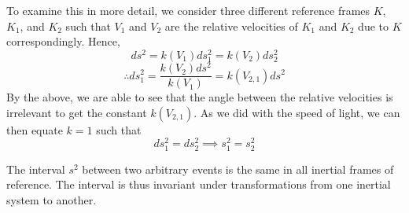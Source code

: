 \documentclass{article}
\begin{document}
			To examine this in more detail, we consider three different reference frames $K$, $K_1$, and $K_2$ such that $V_1$ and $V_2$ are the relative velocities of $K_1$ and $K_2$ due to $K$ correspondingly. Hence,
			$$ ds^2 = k(V_1)ds_1^2 = k(V_2)ds_2^2 $$ 
			$$ \therefore ds_1^2 = \frac{k(V_2)ds^2}{k(V_1)} = k(V_{2,1})ds^2$$
			By the above, we are able to see that the angle between the relative velocities is irrelevant to get the constant $k(V_{2,1})$. As we did with the speed of light, we can then equate $k=1$ such that
			$$ ds_1^2 = ds_2^2 \implies s_1^2 = s_2^2 $$
			\begin{thm}
				The interval $s^2$ between two arbitrary events is the same in all inertial frames of reference. The interval is thus invariant under transformations from one inertial system to another.
			\end{thm} 
\end{document}
